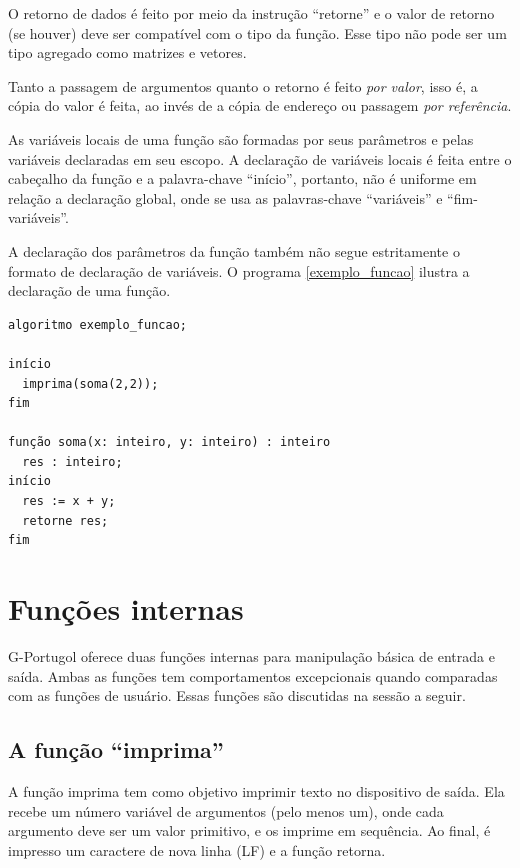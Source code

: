 \documentclass[a4paper,11pt]{report}
\begin{document}
O retorno de dados é feito por meio da instrução ``retorne'' e o valor de
retorno (se houver) deve ser compatível com o tipo da função. Esse tipo não pode
ser um tipo agregado como matrizes e vetores.

Tanto a passagem de argumentos quanto o retorno é feito \textit{por valor}, isso
é, a cópia do valor é feita, ao invés de a cópia de endereço ou passagem
\textit{por referência}.

As variáveis locais de uma função são formadas por seus parâmetros e pelas
variáveis declaradas em seu escopo. A declaração de variáveis locais é feita
entre o cabeçalho da função e a palavra-chave ``início'', portanto, não é
uniforme em relação a declaração global, onde se usa as palavras-chave
``variáveis'' e ``fim-variáveis''.

A declaração dos parâmetros da função também não segue estritamente o formato de
declaração de variáveis. O programa \ref{exemplo_funcao}
ilustra a declaração de uma função.

\begin{program}
 \begin{verbatim}
algoritmo exemplo_funcao;

início
  imprima(soma(2,2));
fim

função soma(x: inteiro, y: inteiro) : inteiro
  res : inteiro;
início
  res := x + y;
  retorne res;
fim
  \end{verbatim}

  \caption{Exemplo de usos de funções. \label{exemplo_funcao}}
\end{program}

\section {Funções internas}

G-Portugol oferece duas funções internas para manipulação básica de entrada e
saída. Ambas as funções tem comportamentos excepcionais quando comparadas com as
funções de usuário. Essas funções são discutidas na sessão a seguir.

\subsection{A função ``imprima''}

A função imprima tem como objetivo imprimir texto no dispositivo de saída. Ela
recebe um número variável de argumentos (pelo menos um), onde cada argumento
deve ser um valor primitivo, e os imprime em sequência. Ao final, é impresso um
caractere de nova linha (LF) e a função retorna.
\end{document}
